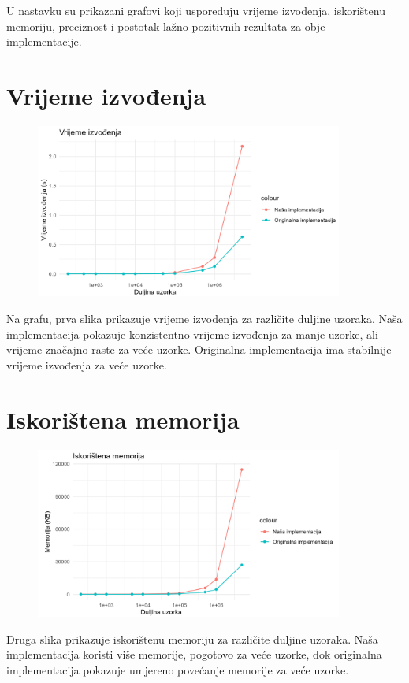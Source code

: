 \documentclass[seminarskirad]{fer}
\begin{document}
U nastavku su prikazani grafovi koji uspoređuju vrijeme izvođenja, iskorištenu memoriju, preciznost i postotak lažno pozitivnih rezultata za obje implementacije.

\section{Vrijeme izvođenja}
\begin{figure}[h]
	\centering
	\includegraphics[width=0.9\textwidth]{images/nasumicni_rezultati_vrijeme.png}
	\label{fig:nasumicni_rezultati_vrijeme}
\end{figure}
Na grafu, prva slika prikazuje vrijeme izvođenja za različite duljine uzoraka. Naša implementacija pokazuje konzistentno vrijeme izvođenja za manje uzorke, ali vrijeme značajno raste za veće uzorke. Originalna implementacija ima stabilnije vrijeme izvođenja za veće uzorke.

\section{Iskorištena memorija}
\begin{figure}[h]
	\centering
	\includegraphics[width=0.9\textwidth]{images/nasumicni_rezultati_memorija.png}
	\label{fig:nasumicni_rezultati_memorija}
\end{figure}
Druga slika prikazuje iskorištenu memoriju za različite duljine uzoraka. Naša implementacija koristi više memorije, pogotovo za veće uzorke, dok originalna implementacija pokazuje umjereno povećanje memorije za veće uzorke.
\end{document}
